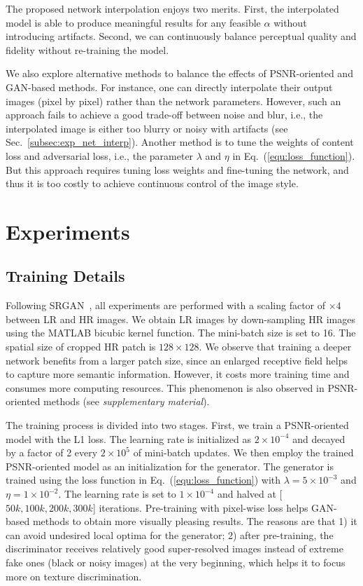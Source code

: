 \documentclass[runningheads]{llncs}
\begin{document}
The proposed network interpolation enjoys two merits. First, the interpolated model is able to produce meaningful  
results for any feasible $\alpha$ without introducing artifacts. Second, we can continuously balance perceptual quality 
and fidelity without re-training the model.

We also explore alternative methods to balance the effects of PSNR-oriented and GAN-based methods.
%
For instance, one can directly interpolate their output images (pixel by pixel) rather than the network parameters.
%
However, such an approach fails to achieve a good trade-off between noise and blur, i.e., the interpolated image is 
either too blurry or noisy with artifacts (see Sec.~\ref{subsec:exp_net_interp}). 
%
Another method is to tune the weights of content loss and adversarial loss, i.e., the parameter $\lambda$ and $\eta$ in 
Eq.~(\ref{equ:loss_function}).
%
But this approach requires tuning loss weights and fine-tuning the network, and thus it is too costly to achieve 
continuous control of the image style.


\section{Experiments} \label{sec:exp}
\subsection{Training Details}

Following SRGAN~\cite{ledig2017photo}, all experiments are performed with a scaling factor of $\times 4$ between LR and 
HR images.
%
We obtain LR images by down-sampling HR images using the MATLAB bicubic kernel function. The mini-batch size is set to 
16. The spatial size of cropped HR patch is $128 \times 128$.
We observe that training a deeper network benefits from a larger patch size, since an enlarged receptive field helps to 
capture more semantic information. However, it costs more training time and consumes more computing resources. 
%
This phenomenon is also observed in PSNR-oriented methods (see \textit{supplementary material}).


The training process is divided into two stages. 
%
First, we train a PSNR-oriented model with the L1 loss. 
The learning rate is initialized as $2\times 10^{-4}$ and decayed by a factor of 2 every $2 \times 10^5$ of mini-batch 
updates. 
%
We then employ the trained PSNR-oriented model as an initialization for the generator.
%
The generator is trained using the loss function in Eq.~(\ref{equ:loss_function}) with $\lambda=5 \times 10^{-3}$ 
and $\eta=1 \times 10^{-2}$. 
The learning rate is set to $1\times 10^{-4}$ and halved at [$50k, 100k, 200k, 300k$] iterations.
Pre-training with pixel-wise loss helps GAN-based methods to obtain more visually pleasing results.
%
The reasons are that 1) it can avoid undesired local optima for the generator; 
%
2) after pre-training, the discriminator receives relatively good super-resolved images instead of extreme fake ones 
(black or noisy images) at the very beginning, which helps it to focus more on texture discrimination.
\end{document}
